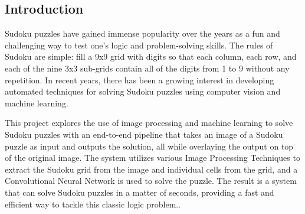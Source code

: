 \begin{multicols}{2}
\tableofcontents
\section{Introduction}
Sudoku puzzles have gained immense popularity over the years as a fun and challenging way to test one's logic and problem-solving skills. The rules of Sudoku are simple: fill a 9x9 grid with digits so that each column, each row, and each of the nine 3x3 sub-grids contain all of the digits from 1 to 9 without any repetition. In recent years, there has been a growing interest in developing automated techniques for solving Sudoku puzzles using computer vision and machine learning.

This project explores the use of image processing and machine learning to solve Sudoku puzzles with an end-to-end pipeline that takes an image of a Sudoku puzzle as input and outputs the solution, all while overlaying the output on top of the original image. The system utilizes various Image Processing Techniques to extract the Sudoku grid from the image and individual cells from the grid, and a Convolutional Neural Network is used to solve the puzzle. The result is a system that can solve Sudoku puzzles in a matter of seconds, providing a fast and efficient way to tackle this classic logic problem..

\end{multicols}